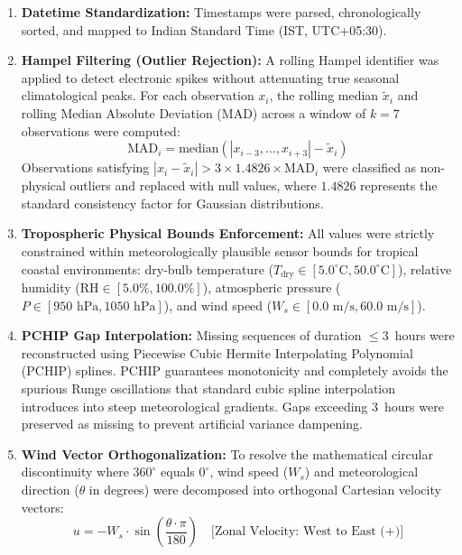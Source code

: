 \documentclass[a4paper,fleqn]{cas-sc}
\begin{document}
\begin{enumerate}[1.]
    \item \textbf{Datetime Standardization:} Timestamps were parsed, chronologically sorted, and mapped to Indian Standard Time (IST, UTC+05:30).
    \item \textbf{Hampel Filtering (Outlier Rejection):} A rolling Hampel identifier was applied to detect electronic spikes without attenuating true seasonal climatological peaks. For each observation $x_i$, the rolling median $\tilde{x}_i$ and rolling Median Absolute Deviation (MAD) across a window of $k = 7$ observations were computed:
    \begin{equation}
        \text{MAD}_i = \text{median}\left( |x_{i-3}, \dots, x_{i+3}| - \tilde{x}_i \right)
        \label{eq:mad}
    \end{equation}
    Observations satisfying $|x_i - \tilde{x}_i| > 3 \times 1.4826 \times \text{MAD}_i$ were classified as non-physical outliers and replaced with null values, where $1.4826$ represents the standard consistency factor for Gaussian distributions.
    \item \textbf{Tropospheric Physical Bounds Enforcement:} All values were strictly constrained within meteorologically plausible sensor bounds for tropical coastal environments: dry-bulb temperature ($T_{\text{dry}} \in [5.0^\circ\text{C}, 50.0^\circ\text{C}]$), relative humidity ($\text{RH} \in [5.0\%, 100.0\%]$), atmospheric pressure ($P \in [950\text{ hPa}, 1050\text{ hPa}]$), and wind speed ($W_s \in [0.0\text{ m/s}, 60.0\text{ m/s}]$).
    \item \textbf{PCHIP Gap Interpolation:} Missing sequences of duration $\le 3$~hours were reconstructed using Piecewise Cubic Hermite Interpolating Polynomial (PCHIP) splines. PCHIP guarantees monotonicity and completely avoids the spurious Runge oscillations that standard cubic spline interpolation introduces into steep meteorological gradients. Gaps exceeding 3~hours were preserved as missing to prevent artificial variance dampening.
    \item \textbf{Wind Vector Orthogonalization:} To resolve the mathematical circular discontinuity where $360^\circ$ equals $0^\circ$, wind speed ($W_s$) and meteorological direction ($\theta$ in degrees) were decomposed into orthogonal Cartesian velocity vectors:
    \begin{equation}
        u = -W_s \cdot \sin\left( \frac{\theta \cdot \pi}{180} \right) \quad \text{[Zonal Velocity: West to East (+)]}
        \label{eq:wind_u}
    \end{equation}

\end{enumerate}
\end{document}
